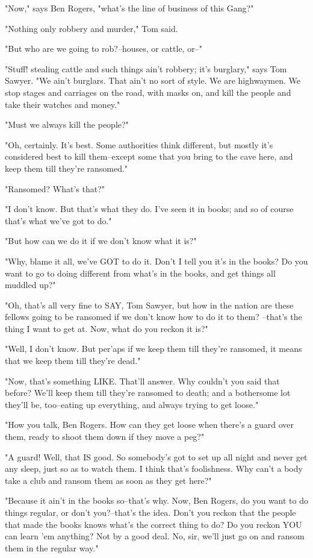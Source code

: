 "Now," says Ben Rogers, "what's the line of business of this Gang?"

"Nothing only robbery and murder," Tom said.

"But who are we going to rob?--houses, or cattle, or--"

"Stuff! stealing cattle and such things ain't robbery; it's burglary,"
says Tom Sawyer.  "We ain't burglars.  That ain't no sort of style.  We
are highwaymen.  We stop stages and carriages on the road, with masks on,
and kill the people and take their watches and money."

"Must we always kill the people?"

"Oh, certainly.  It's best.  Some authorities think different, but mostly
it's considered best to kill them--except some that you bring to the cave
here, and keep them till they're ransomed."

"Ransomed?  What's that?"

"I don't know.  But that's what they do.  I've seen it in books; and so
of course that's what we've got to do."

"But how can we do it if we don't know what it is?"

"Why, blame it all, we've GOT to do it.  Don't I tell you it's in the
books?  Do you want to go to doing different from what's in the books,
and get things all muddled up?"

"Oh, that's all very fine to SAY, Tom Sawyer, but how in the nation are
these fellows going to be ransomed if we don't know how to do it to them?
--that's the thing I want to get at.  Now, what do you reckon it is?"

"Well, I don't know.  But per'aps if we keep them till they're ransomed,
it means that we keep them till they're dead."

"Now, that's something LIKE.  That'll answer.  Why couldn't you said that
before?  We'll keep them till they're ransomed to death; and a bothersome
lot they'll be, too--eating up everything, and always trying to get
loose."

"How you talk, Ben Rogers.  How can they get loose when there's a guard
over them, ready to shoot them down if they move a peg?"

"A guard!  Well, that IS good.  So somebody's got to set up all night and
never get any sleep, just so as to watch them.  I think that's
foolishness. Why can't a body take a club and ransom them as soon as they
get here?"

"Because it ain't in the books so--that's why.  Now, Ben Rogers, do you
want to do things regular, or don't you?--that's the idea.  Don't you
reckon that the people that made the books knows what's the correct thing
to do?  Do you reckon YOU can learn 'em anything?  Not by a good deal.
No, sir, we'll just go on and ransom them in the regular way."

